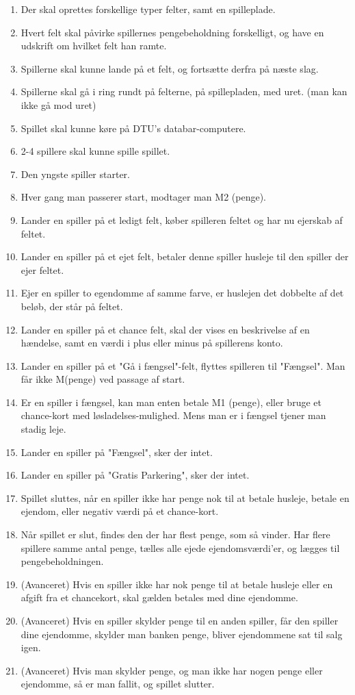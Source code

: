 \begin{enumerate}
\item Der skal oprettes forskellige typer felter, samt en spilleplade.
\item Hvert felt skal påvirke spillernes pengebeholdning forskelligt, og have en udskrift om hvilket felt han ramte.
\item Spillerne skal kunne lande på et felt, og fortsætte derfra på næste slag.

\item Spillerne skal gå i ring rundt på felterne, på spillepladen, med uret. (man kan ikke gå mod uret)
\item Spillet skal kunne køre på DTU's databar-computere.
\item 2-4 spillere skal kunne spille spillet.
\item Den yngste spiller starter.
\item Hver gang man passerer start, modtager man M2 (penge).

\item Lander en spiller på et ledigt felt, køber spilleren feltet og har nu ejerskab af feltet.
\item Lander en spiller på et ejet felt, betaler denne spiller husleje til den spiller der ejer feltet.
\item Ejer en spiller to egendomme af samme farve, er huslejen det dobbelte af det beløb, der står på feltet.
\item Lander en spiller på et chance felt, skal der vises en beskrivelse af en hændelse, samt en værdi i plus eller minus på spillerens konto.
\item Lander en spiller på et "Gå i fængsel"-felt, flyttes spilleren til "Fængsel". Man får ikke M(penge) ved passage af start.

\item Er en spiller i fængsel, kan man enten betale M1 (penge), eller bruge et chance-kort med løsladelses-mulighed. Mens man er i fængsel tjener man stadig leje.
\item Lander en spiller på "Fængsel", sker der intet.
\item Lander en spiller på "Gratis Parkering", sker der intet.
\item Spillet sluttes, når en spiller ikke har penge nok til at betale husleje, betale en ejendom, eller negativ værdi på et chance-kort.
\item Når spillet er slut, findes den der har flest penge, som så vinder. Har flere spillere samme antal penge, tælles alle ejede ejendomsværdi'er, og lægges til pengebeholdningen.

\item (Avanceret) Hvis en spiller ikke har nok penge til at betale husleje eller en afgift fra et chancekort, skal gælden betales med dine ejendomme.
\item (Avanceret) Hvis en spiller skylder penge til en anden spiller, får den spiller dine ejendomme, skylder man banken penge, bliver ejendommene sat til salg igen.
\item (Avanceret) Hvis man skylder penge, og man ikke har nogen penge eller ejendomme, så er man fallit, og spillet slutter.\\
\end{enumerate}

